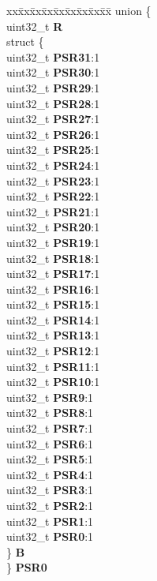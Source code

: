 \begin{DoxyCompactItemize}
\begin{tabbing}
\end{tabbing}\item 
\mbox{\label{structADC__tag_a155152ea2aa6841b527f0cc5d950b2e9}} 
\begin{tabbing}
xx\=xx\=xx\=xx\=xx\=xx\=xx\=xx\=xx\=\kill
union \{\\
\>uint32\_t {\bfseries R}\\
\>struct \{\\
\>\>uint32\_t {\bfseries PSR31}:1\\
\>\>uint32\_t {\bfseries PSR30}:1\\
\>\>uint32\_t {\bfseries PSR29}:1\\
\>\>uint32\_t {\bfseries PSR28}:1\\
\>\>uint32\_t {\bfseries PSR27}:1\\
\>\>uint32\_t {\bfseries PSR26}:1\\
\>\>uint32\_t {\bfseries PSR25}:1\\
\>\>uint32\_t {\bfseries PSR24}:1\\
\>\>uint32\_t {\bfseries PSR23}:1\\
\>\>uint32\_t {\bfseries PSR22}:1\\
\>\>uint32\_t {\bfseries PSR21}:1\\
\>\>uint32\_t {\bfseries PSR20}:1\\
\>\>uint32\_t {\bfseries PSR19}:1\\
\>\>uint32\_t {\bfseries PSR18}:1\\
\>\>uint32\_t {\bfseries PSR17}:1\\
\>\>uint32\_t {\bfseries PSR16}:1\\
\>\>uint32\_t {\bfseries PSR15}:1\\
\>\>uint32\_t {\bfseries PSR14}:1\\
\>\>uint32\_t {\bfseries PSR13}:1\\
\>\>uint32\_t {\bfseries PSR12}:1\\
\>\>uint32\_t {\bfseries PSR11}:1\\
\>\>uint32\_t {\bfseries PSR10}:1\\
\>\>uint32\_t {\bfseries PSR9}:1\\
\>\>uint32\_t {\bfseries PSR8}:1\\
\>\>uint32\_t {\bfseries PSR7}:1\\
\>\>uint32\_t {\bfseries PSR6}:1\\
\>\>uint32\_t {\bfseries PSR5}:1\\
\>\>uint32\_t {\bfseries PSR4}:1\\
\>\>uint32\_t {\bfseries PSR3}:1\\
\>\>uint32\_t {\bfseries PSR2}:1\\
\>\>uint32\_t {\bfseries PSR1}:1\\
\>\>uint32\_t {\bfseries PSR0}:1\\
\>\} {\bfseries B}\\
\} {\bfseries PSR0}\\


\end{tabbing}
\end{DoxyCompactItemize}
